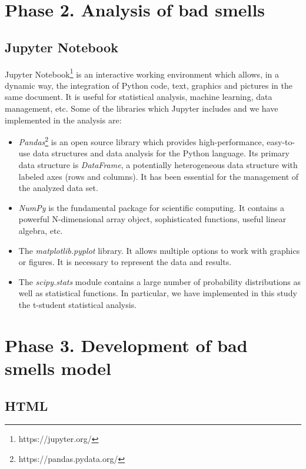 \section{Phase 2. Analysis of bad smells}
\label{sec:phase_2}

\subsection{Jupyter Notebook}
\label{subsec:jupyter}

Jupyter Notebook\footnote{https://jupyter.org/} is an interactive working environment which allows, in a dynamic way, the integration of Python code, text, graphics and pictures in the same document. It is useful for statistical analysis, machine learning, data management, etc. Some of the libraries which Jupyter includes and we have implemented in the analysis are:

\begin{itemize}
    \item \textit{Pandas}\footnote{https://pandas.pydata.org/} is an open source library which provides high-performance, easy-to-use data structures and data analysis for the Python language. Its primary data structure is \textit{DataFrame}, a potentially heterogeneous data structure with labeled axes (rows and columns). It has been essential for the management of the analyzed data set.
    \item \textit{NumPy} is the fundamental package for scientific computing. It contains a powerful N-dimensional array object, sophisticated functions, useful linear algebra, etc.
    \item The \textit{matplotlib.pyplot} library. It allows multiple options to work with graphics or figures. It is necessary to represent the data and results.
    \item The \textit{scipy.stats} module contains a large number of probability distributions as well as statistical functions. In particular, we have implemented in this study the t-student statistical analysis. 
\end{itemize}



\section{Phase 3. Development of bad smells model}
\label{sec:phase_3}

\subsection{HTML}
\label{subsec:html}

